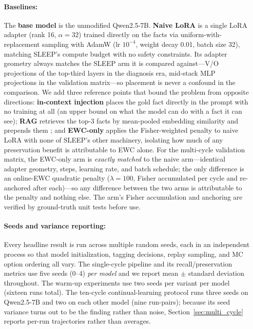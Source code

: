 \paragraph{Baselines:}
The \textbf{base model} is the unmodified Qwen2.5-7B. \textbf{Naive LoRA} is a single LoRA adapter (rank 16, $\alpha=32$) trained directly on the facts via uniform-with-replacement sampling with AdamW (lr $10^{-4}$, weight decay 0.01, batch size 32), matching SLEEP's compute budget with no safety constraints. Its adapter geometry always matches the SLEEP arm it is compared against---V/O projections of the top-third layers in the diagnosis era, mid-stack MLP projections in the validation matrix---so placement is never a confound in the comparison. We add three reference points that bound the problem from opposite directions: \textbf{in-context injection} places the gold fact directly in the prompt with no training at all (an upper bound on what the model can do with a fact it can see); \textbf{RAG} retrieves the top-3 facts by mean-pooled embedding similarity and prepends them \citep{lewis2020retrieval}; and \textbf{EWC-only} applies the Fisher-weighted penalty to naive LoRA with none of SLEEP's other machinery, isolating how much of any preservation benefit is attributable to EWC alone. For the multi-cycle validation matrix, the EWC-only arm is \emph{exactly matched} to the naive arm---identical adapter geometry, steps, learning rate, and batch schedule; the only difference is an online-EWC quadratic penalty ($\lambda=100$, Fisher accumulated per cycle and re-anchored after each)---so any difference between the two arms is attributable to the penalty and nothing else. The arm's Fisher accumulation and anchoring are verified by ground-truth unit tests before use.

\paragraph{Seeds and variance reporting:}
Every headline result is run across multiple random seeds, each in an independent process so that model initialization, tagging decisions, replay sampling, and MC option ordering all vary. The single-cycle pipeline and its recall/preservation metrics use five seeds (0--4) \emph{per model} and we report mean $\pm$ standard deviation throughout. The warm-up experiments use two seeds per variant per model (sixteen runs total). The ten-cycle continual-learning protocol runs three seeds on Qwen2.5-7B and two on each other model (nine run-pairs); because its seed variance turns out to be the finding rather than noise, Section~\ref{sec:multi_cycle} reports per-run trajectories rather than averages.

